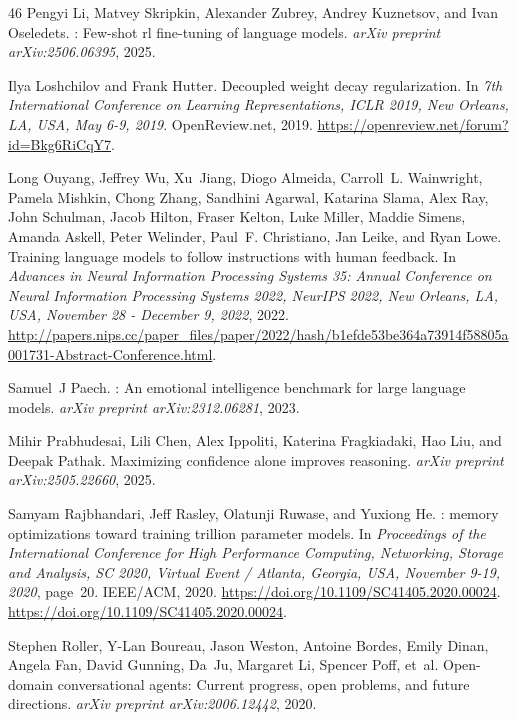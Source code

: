 \begin{thebibliography}{46}
Pengyi Li, Matvey Skripkin, Alexander Zubrey, Andrey Kuznetsov, and Ivan Oseledets.
: Few-shot rl fine-tuning of language models.
\newblock \emph{arXiv preprint arXiv:2506.06395}, 2025.

Ilya Loshchilov and Frank Hutter.
\newblock Decoupled weight decay regularization.
\newblock In \emph{7th International Conference on Learning Representations, {ICLR} 2019, New Orleans, LA, USA, May 6-9, 2019}. OpenReview.net, 2019.
\newblock \url{https://openreview.net/forum?id=Bkg6RiCqY7}.

Long Ouyang, Jeffrey Wu, Xu~Jiang, Diogo Almeida, Carroll~L. Wainwright, Pamela Mishkin, Chong Zhang, Sandhini Agarwal, Katarina Slama, Alex Ray, John Schulman, Jacob Hilton, Fraser Kelton, Luke Miller, Maddie Simens, Amanda Askell, Peter Welinder, Paul~F. Christiano, Jan Leike, and Ryan Lowe.
\newblock Training language models to follow instructions with human feedback.
\newblock In \emph{Advances in Neural Information Processing Systems 35: Annual Conference on Neural Information Processing Systems 2022, NeurIPS 2022, New Orleans, LA, USA, November 28 - December 9, 2022}, 2022.
\newblock \url{http://papers.nips.cc/paper\_files/paper/2022/hash/b1efde53be364a73914f58805a001731-Abstract-Conference.html}.

Samuel~J Paech.
: An emotional intelligence benchmark for large language models.
\newblock \emph{arXiv preprint arXiv:2312.06281}, 2023.

Mihir Prabhudesai, Lili Chen, Alex Ippoliti, Katerina Fragkiadaki, Hao Liu, and Deepak Pathak.
\newblock Maximizing confidence alone improves reasoning.
\newblock \emph{arXiv preprint arXiv:2505.22660}, 2025.

Samyam Rajbhandari, Jeff Rasley, Olatunji Ruwase, and Yuxiong He.
: memory optimizations toward training trillion parameter models.
\newblock In \emph{Proceedings of the International Conference for High Performance Computing, Networking, Storage and Analysis, {SC} 2020, Virtual Event / Atlanta, Georgia, USA, November 9-19, 2020}, page~20. {IEEE/ACM}, 2020.
\newblock \url{https://doi.org/10.1109/SC41405.2020.00024}.
\newblock \url{https://doi.org/10.1109/SC41405.2020.00024}.

Stephen Roller, Y-Lan Boureau, Jason Weston, Antoine Bordes, Emily Dinan, Angela Fan, David Gunning, Da~Ju, Margaret Li, Spencer Poff, et~al.
\newblock Open-domain conversational agents: Current progress, open problems, and future directions.
\newblock \emph{arXiv preprint arXiv:2006.12442}, 2020.


\end{thebibliography}
